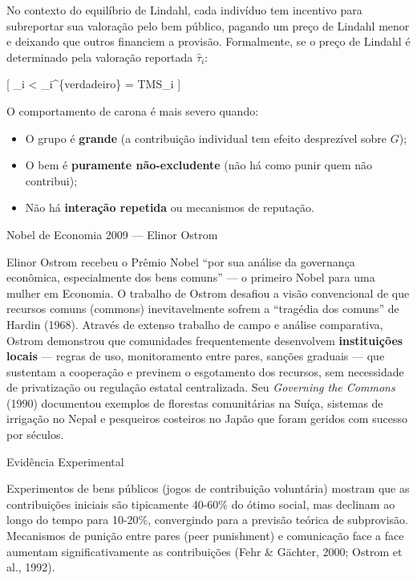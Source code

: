\documentclass[11pt,twoside,openright]{book}
\providecommand{\tightlist}{\setlength{\itemsep}{0pt}\setlength{\parskip}{0pt}}
\begin{document}
No contexto do equilíbrio de Lindahl, cada indivíduo tem incentivo para
subreportar sua valoração pelo bem público, pagando um preço de Lindahl
menor e deixando que outros financiem a provisão. Formalmente, se o
preço de Lindahl é determinado pela valoração reportada
\(\hat{\tau}_i\):

{[} \hat{\tau}\_i \textless{} \tau\_i\^{}\{verdadeiro\} = TMS\_i {]}

O comportamento de carona é mais severo quando:

\begin{itemize}
\tightlist
\item
  O grupo é \textbf{grande} (a contribuição individual tem efeito
  desprezível sobre \(G\));
\item
  O bem é \textbf{puramente não-excludente} (não há como punir quem não
  contribui);
\item
  Não há \textbf{interação repetida} ou mecanismos de reputação.
\end{itemize}

\begin{infobox}{Nobel de Economia 2009 — Elinor Ostrom}

Elinor Ostrom recebeu o Prêmio Nobel ``por sua análise da governança
econômica, especialmente dos bens comuns'' --- o primeiro Nobel para uma
mulher em Economia. O trabalho de Ostrom desafiou a visão convencional
de que recursos comuns (commons) inevitavelmente sofrem a ``tragédia dos
comuns'' de Hardin (1968). Através de extenso trabalho de campo e
análise comparativa, Ostrom demonstrou que comunidades frequentemente
desenvolvem \textbf{instituições locais} --- regras de uso,
monitoramento entre pares, sanções graduais --- que sustentam a
cooperação e previnem o esgotamento dos recursos, sem necessidade de
privatização ou regulação estatal centralizada. Seu \emph{Governing the
Commons} (1990) documentou exemplos de florestas comunitárias na Suíça,
sistemas de irrigação no Nepal e pesqueiros costeiros no Japão que foram
geridos com sucesso por séculos.

\end{infobox}

\begin{notebox}{Evidência Experimental}

Experimentos de bens públicos (jogos de contribuição voluntária) mostram
que as contribuições iniciais são tipicamente 40-60\% do ótimo social,
mas declinam ao longo do tempo para 10-20\%, convergindo para a previsão
teórica de subprovisão. Mecanismos de punição entre pares (peer
punishment) e comunicação face a face aumentam significativamente as
contribuições (Fehr \& Gächter, 2000; Ostrom et al., 1992).

\end{notebox}
\end{document}
